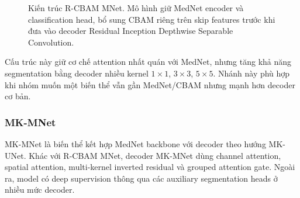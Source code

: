 \documentclass[12pt,a4paper]{article}
\begin{document}
\begin{figure}[H]
{
}
\caption{Kiến trúc R-CBAM MNet. Mô hình giữ MedNet encoder và classification head, bổ sung CBAM riêng trên skip features trước khi đưa vào decoder Residual Inception Depthwise Separable Convolution.}
\end{figure}

Cấu trúc này giữ cơ chế attention nhất quán với MedNet, nhưng tăng khả năng segmentation bằng decoder nhiều kernel \(1 \times 1\), \(3 \times 3\), \(5 \times 5\). Nhánh này phù hợp khi nhóm muốn một biến thể vẫn gần MedNet/CBAM nhưng mạnh hơn decoder cơ bản.

\subsubsection*{MK-MNet}

MK-MNet là biến thể kết hợp MedNet backbone với decoder theo hướng MK-UNet. Khác với R-CBAM MNet, decoder MK-MNet dùng channel attention, spatial attention, multi-kernel inverted residual và grouped attention gate. Ngoài ra, model có deep supervision thông qua các auxiliary segmentation heads ở nhiều mức decoder.
\end{document}
